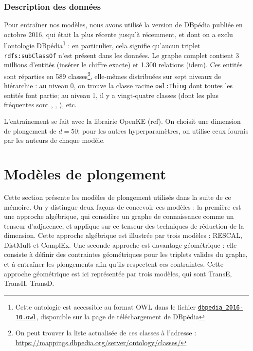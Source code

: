 \subsubsection{Description des données}
\label{subsec:kge-data-dbpedia}
Pour entraîner nos modèles, nous avons utilisé la version de DBpédia publiée en octobre 2016, qui était la plus récente jusqu'à récemment, et dont on a exclu l'ontologie DBpédia\footnote{Cette ontologie est accessible au format OWL dans le fichier \texttt{\href{http://downloads.dbpedia.org/2016-10/dbpedia\_2016-10.owl}{dbpedia\_2016-10.owl}}, disponible sur la page de téléchargement de DBpédia} : en particulier, cela signifie qu'aucun triplet \texttt{rdfs:subClassOf} n'est présent dans les données. Le graphe complet contient 3 millions d'entités (insérer le chiffre exacte) et 1.300 relations (idem). Ces entités sont réparties en 589 classes\footnote{On peut trouver la liste actualisée de ces classes à l'adresse : \href{mappings.dbpedia.org/server/ontology/classes/}{https://mappings.dbpedia.org/server/ontology/classes/}}, elle-mêmes distribuées sur sept niveaux de hiérarchie : au niveau 0, on trouve la classe racine \texttt{owl:Thing} dont toutes les entités font partie; au niveau 1, il y a vingt-quatre classes (dont les plus fréquentes sont , , ), etc. 

L'entraînement se fait avec la librairie OpenKE (ref). On choisit une dimension de plongement de $d=50$; pour les autres hyperparamètres, on utilise ceux fournis par les auteurs de chaque modèle.








\section{Modèles de plongement}
\label{sec:kge-models}

Cette section présente les modèles de plongement utilisés dans la suite de ce mémoire. On y distingue deux façons de concevoir ces modèles : la première est une approche algébrique, qui considère un graphe de connaissance comme un tenseur d'adjacence, et applique sur ce tenseur des techniques de réduction de la dimension. %
Cette approche algébrique est illustrée par trois modèles : RESCAL, DistMult et ComplEx. Une seconde approche est davantage géométrique : elle consiste à définir des contraintes géométriques pour les triplets valides du graphe, et à entraîner les plongements afin qu'ils respectent ces contraintes. %
Cette approche géométrique est ici représentée par trois modèles, qui sont TransE, TransH, TransD. 


